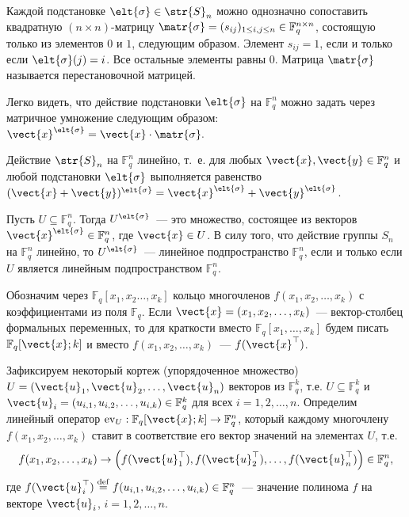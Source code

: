 \documentclass[14pt]{cmcmsuthesis-bachelor}
\begin{document}
Каждой подстановке \(\elt{\sigma}\in \str{S}_{n}\) можно однозначно сопоставить квадратную \((n\times n)\)-матрицу \(\matr{\sigma}=(s_{ij})_{1\le i,j\le n}\in \mathbb{F}^{n \times n}_{q}\), состоящую только из элементов \(0\) и \(1\), следующим образом.
Элемент \(s_{ij}=1\), если и только если \(\elt{\sigma}(j)=i\).
Все остальные элементы равны \(0\).
Матрица \(\matr{\sigma}\) называется перестановочной матрицей.

Легко видеть, что действие подстановки \(\elt{\sigma}\) на \(\mathbb{F}^n_q\) можно задать через матричное умножение следующим образом:
\(\vect{x}^{\elt{\sigma}}=\vect{x}\cdot \matr{\sigma}.\)

Действие \(\str{S}_{n}\) на \(\mathbb{F}^n_q\) линейно, т.~е. для любых \(\vect{x}, \vect{y}\in \mathbb{F}^n_q\) и любой подстановки \(\elt{\sigma}\) выполняется равенство \((\vect{x}+\vect{y})^{\elt{\sigma}}=\vect{x}^{\elt{\sigma}}+\vect{y}^{\elt{\sigma}}\).

Пусть \(U\subseteq \mathbb{F}^n_q\).
Тогда \(U^{\elt{\sigma}}\)~--- это множество, состоящее из векторов \(\vect{x}^{\elt{\sigma}}\in \mathbb{F}^n_q\), где \(\vect{x}\in U\).
В силу того, что действие группы \(S_n\) на \(\mathbb{F}^n_q\) линейно, то \(U^{\elt{\sigma}}\)~--- линейное подпространство \(\mathbb{F}^n_q\), если и только если \(U\) является линейным подпространством \(\mathbb{F}^n_q\).

Обозначим через \(\mathbb{F}_{q}[x_1,x_{2}\dotsc, x_{k}]\) кольцо многочленов \(f(x_1, x_2,\dotsc, x_{k})\) с коэффициентами из поля \(\mathbb{F}_{q}\).
Если \(\vect{x}=(x_1,x_2, \dotsc, x_{k})\)~--- вектор-столбец формальных переменных, то для краткости вместо \(\mathbb{F}_{q}[x_1,\dotsc, x_{k}]\) будем писать \(\mathbb{F}_{q}[\vect{x};k]\) и вместо \(f(x_1,x_2, \dotsc, x_k)\)~--- \(f(\vect{x}^{\top})\).

Зафиксируем некоторый кортеж (упорядоченное множество) \(U= \left(\vect{u}_1, \vect{u}_2, \dotsc, \vect{u}_{n}\right)\) векторов из \(\mathbb{F}^k_{q}\), т.е. \(U\subseteq \mathbb{F}^{k}_{q}\) и \(\vect{u}_i=(u_{i,1}, u_{i,2}, \dotsc, u_{i,k})\in \mathbb{F}^{k}_{q}\) для всех \(i=1,2, \dotsc, n\).
Определим линейный оператор \(\operatorname{ev}_{U}: \mathbb{F}_{q}[\vect{x};k] \rightarrow  \mathbb{F}^{n}_{q}\), который каждому многочлену \(f(x_1, x_2, \dotsc, x_{k})\) ставит в соответствие его вектор значений на элементах \(U\), т.е.
\[ f(x_1,x_2, \dotsc, x_k) \rightarrow \left(f(\vect{u}^{\top}_{1}), f(\vect{u}^{\top}_{2}), \dotsc, f(\vect{u}^{\top}_{n})\right)\in \mathbb{F}^{n}_{q}, \]
где \(f(\vect{u}^{\top}_i) \stackrel{\mathrm{def}}{=} f(u_{i,1}, u_{i,2}, \dotsc, u_{i,k})\in \mathbb{F}^{n}_{q}\)~--- значение полинома \(f\) на векторе \(\vect{u}_{i}\), \(i=1,2, \dotsc, n\).
\end{document}
